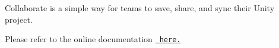 Collaborate is a simple way for teams to save, share, and sync their Unity project.

Please refer to the online documentation \href{https://docs.unity3d.com/Manual/UnityCollaborate.html}{\texttt{ here.}} 